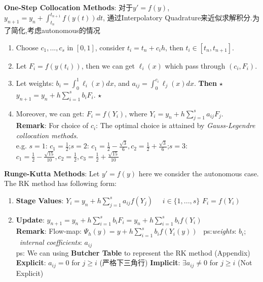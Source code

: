\documentclass[9pt]{article}
\begin{document}
\textbf{One-Step Collocation Methods}: {\footnotesize 对于$y'=f(y)$, $y_{n+1}=y_n+\int_{t_n}^{t_{n+1}}f(y(t))dt$, 通过Interpolatory Quadrature来近似求解积分.}{\tiny 为了简化,考虑autonomous的情况}

\begin{enumerate}[itemsep=-2pt, topsep=-2pt]
    \item Choose $c_1,...,c_s$ in $[0,1]$, consider $t_i=t_n+c_ih$, then $t_i\in[t_n,t_{n+1}]$.
    \item Let $F_i=f(y(t_i))$, then we can get $\ell_i(x)$ which pass through $(c_i,F_i)$.
    \item Let weights: $b_i=\int_0^1\ell_i(x)dx$, and $a_{ij}=\int_0^{c_i}\ell_j(x)dx$. \quad \textbf{Then} $\star$ $y_{n+1}=y_n+h\sum_{i=1}^{s}b_iF_i$. $\star$
    \item Moreover, we can get: $F_i=f(Y_i)$, where $Y_i=y_n+h\sum_{j=1}^{s}a_{ij}F_j$. \\
    \textbf{Remark}: {\footnotesize For choice of $c_i$: The optimal choice is attained by \textit{Gauss-Legendre collocation methods}}. \\
    {\scriptsize e.g. $s=1$: $c_1=\frac{1}{2}$;\qquad $s=2$: $c_1=\frac{1}{2}-\frac{\sqrt{3}}{6},c_2=\frac{1}{2}+\frac{\sqrt{3}}{6}$;\qquad $s=3$: $c_1=\frac{1}{2}-\frac{\sqrt{15}}{10},c_2=\frac{1}{2},c_3=\frac{1}{2}+\frac{\sqrt{15}}{10}$}
\end{enumerate}

\textbf{Runge-Kutta Methods}: Let $y'=f(y)$ here we consider the autonomous case. The RK method has following form:

\begin{enumerate}[itemsep=-2pt, topsep=-2pt]
    \item \textbf{Stage Values}: $Y_i=y_n+h\sum_{j=1}^{s}a_{ij}f(Y_{j})$ \ \ $i\in\{1,...,s\}$ \qquad $F_i=f(Y_i)$
    \item \textbf{Update}: $y_{n+1}=y_n+h\sum_{i=1}^{s}b_iF_i=y_n+h\sum_{i=1}^{s}b_if(Y_i)$  \\
    \textbf{Remark}: Flow-map: $\Psi_{h}(y)=y+h\sum_{i=1}^{s}b_if(Y_i(y))$ \qquad \ {\scriptsize ps:\textit{weights}: $b_i$; \ \textit{internal coefficients}: $a_{ij}$} \\
    \small{ps: We can using \textbf{Butcher Table} to represent the RK method (Appendix) \\
    \textbf{Explicit}: $a_{ij}=0$ for $j\geq i$ { (严格下三角行)} \quad \textbf{Implicit}: $\exists a_{ij}\ne0$ for $j\geq i$ (Not Explicit)}
\end{enumerate}
\end{document}
